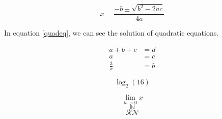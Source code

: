 \documentclass{article}
\begin{document}
\begin{equation*} \label{quadeq}
    x = \frac{-b \pm \sqrt{b^2 - 2ac}}{4a}
\end{equation*}

In equation \ref{quadeq}, we can see the solution of quadratic equations.


\begin{align*}
    a + b + c &= d\\
    a &= c\\
    \frac{3}{x} &= b
\end{align*}

$$\log_2(16)$$

$$\lim_{h\to0} x$$
$$\mathbb{N}$$
$$\mathcal{RN}$$
\end{document}
